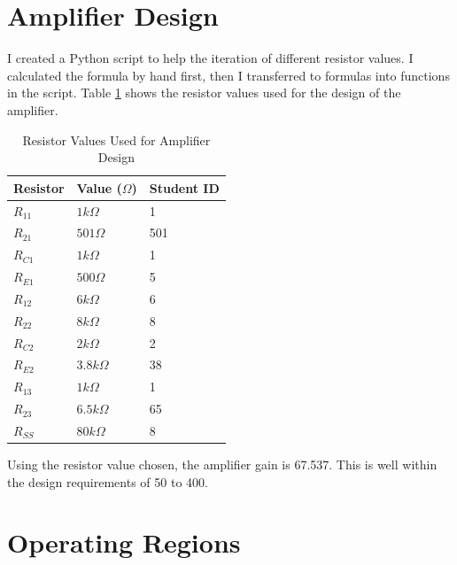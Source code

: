 \documentclass{article}
\begin{document}
\section{Amplifier Design}

I created a Python script to help the iteration of different resistor values.
I calculated the formula by hand first, then I transferred to formulas into functions in the script.
Table \ref{tab:resistor-values} shows the resistor values used for the design of the amplifier.

\begin{table}[h]
    \caption{Resistor Values Used for Amplifier Design}
    \label{tab:resistor-values}
    \centering
    \begin{tabular}{l l l}
        \hline
        Resistor & Value ($\Omega$) & Student ID \\
        \hline
        $R_{11}$ & $1 k\Omega$      & 1          \\
        $R_{21}$ & $501 \Omega$     & 501        \\
        $R_{C1}$ & $1 k\Omega$      & 1          \\
        $R_{E1}$ & $500 \Omega$     & 5          \\
        \hline
        $R_{12}$ & $6 k\Omega$      & 6          \\
        $R_{22}$ & $8 k\Omega$      & 8          \\
        $R_{C2}$ & $2 k\Omega$      & 2          \\
        $R_{E2}$ & $3.8 k\Omega$    & 38         \\
        \hline
        $R_{13}$ & $1 k\Omega$      & 1          \\
        $R_{23}$ & $6.5 k\Omega$    & 65         \\
        $R_{SS}$ & $80 k\Omega$     & 8          \\
        \hline
    \end{tabular}
\end{table}

Using the resistor value chosen, the amplifier gain is 67.537.
This is well within the design requirements of 50 to 400.







\section{Operating Regions}
\end{document}
